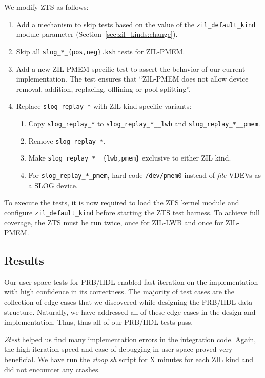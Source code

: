 \documentclass[12pt,a4paper,twoside]{book}
\begin{document}
We modify ZTS as follows:
\begin{enumerate}[noitemsep]
    \item Add a mechanism to skip tests based on the value of the \lstinline{zil_default_kind} module parameter (Section~\ref{sec:zil_kinds:change}).
    \item Skip all \lstinline|slog_*_{pos,neg}.ksh| tests for ZIL-PMEM.
    \item Add a new ZIL-PMEM specific test to assert the behavior of our current implementation.
        The test ensures that ``ZIL-PMEM does not allow device removal, addition, replacing, offlining or pool splitting''.
    \item Replace \lstinline{slog_replay_*} with ZIL kind specific variants:
        \begin{enumerate}
            \item Copy \lstinline{slog_replay_*} to \lstinline{slog_replay_*__lwb} and \lstinline{slog_replay_*__pmem}.
            \item Remove \lstinline{slog_replay_*}.
            \item Make \lstinline|slog_replay_*__{lwb,pmem}| exclusive to either ZIL kind.
            \item For \lstinline{slog_replay_*_pmem}, hard-code \lstinline{/dev/pmem0} instead of \textit{file} VDEVs as a SLOG device.
        \end{enumerate}
\end{enumerate}
To execute the tests, it is now required to load the ZFS kernel module and configure \lstinline{zil_default_kind} before starting the ZTS test harness.
To achieve full coverage, the ZTS must be run twice, once for ZIL-LWB and once for ZIL-PMEM.

\subsection{Results}

Our user-space tests for PRB/HDL enabled fast iteration on the implementation with high confidence in its correctness.
The majority of test cases are the collection of edge-cases that we discovered while designing the PRB/HDL data structure.
Naturally, we have addressed all of these edge cases in the design and implementation.
Thus, thus all of our PRB/HDL tests pass.

\textit{Ztest} helped us find many implementation errors in the integration code.
Again, the high iteration speed and ease of debugging in user space proved very beneficial.
We have run the \textit{zloop.sh} script for X minutes for each ZIL kind and did not encounter any crashes.
\end{document}
